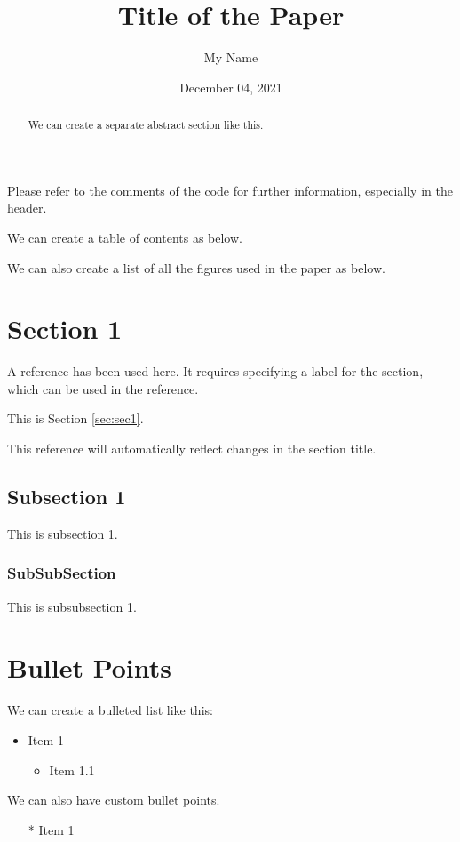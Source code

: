 \documentclass[a4paper, 12pt]{article}
\title{Title of the Paper}
\author{My Name}
\date{December 04, 2021}
\begin{document}
\maketitle

Please refer to the comments of the code for further information, especially in the header.

\bigskip

We can create a table of contents as below.
\tableofcontents

\bigskip

We can also create a list of all the figures used in the paper as below.
\listoffigures

\newpage

\begin{abstract}
    We can create a separate abstract section like this.
\end{abstract}

\section{Section 1}
A reference has been used here. It requires specifying a label for the section, which can be used in the reference.

\label{sec:sec1}
This is Section \ref{sec:sec1}.

This reference will automatically reflect changes in the section title.

\subsection{Subsection 1}
This is subsection 1.

\subsubsection{SubSubSection}
This is subsubsection 1.

\section{Bullet Points}
We can create a bulleted list like this:
\begin{itemize}
    \item Item 1
    \begin{itemize}
        \item Item 1.1
    \end{itemize}
\end{itemize}

We can also have custom bullet points.
\begin{itemize}
    \item[*] Item 1
\end{itemize}
\end{document}
